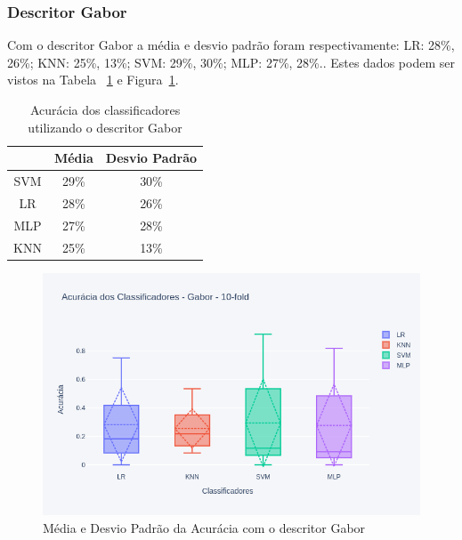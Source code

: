 \subsubsection{Descritor Gabor}
Com o descritor Gabor a média e desvio padrão foram respectivamente: LR: 28\%, 26\%; KNN: 25\%, 13\%; SVM: 29\%, 30\%; MLP: 27\%, 28\%.. Estes dados podem ser vistos na Tabela ~\ref{tab:result_gabor} e Figura~\ref{fig:box_result_gabor}. 


\begin{table}[!htbp]
	\caption{Acurácia dos classificadores utilizando o descritor Gabor}
	\begin{center}
		\begin{tabular}{|c|c|c|}
			\hline
			& Média & Desvio Padrão \\
			\hline
			SVM       & 29\% & 30\% \\
			LR        & 28\% & 26\% \\
			MLP       & 27\% & 28\% \\
			KNN       & 25\% & 13\% \\
			\hline
		\end{tabular}
		\label{tab:result_gabor}
	\end{center}
\end{table}

\begin{figure}[!htbp]
	\centering
	\includegraphics[width=1.0\linewidth,clip=true,trim=0cm 0cm 0cm 0cm, keepaspectratio=true]{box_result_gabor.png}
	\caption{Média e Desvio Padrão da Acurácia com o descritor Gabor}
	\label{fig:box_result_gabor}
\end{figure}